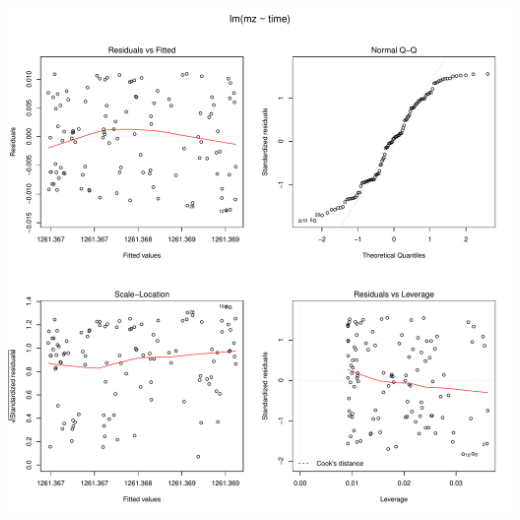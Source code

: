 \documentclass[]{article}
\begin{document}
\includegraphics{Supplementary_document_files/figure-latex/fit.lin.1261-1.pdf}
\end{document}
